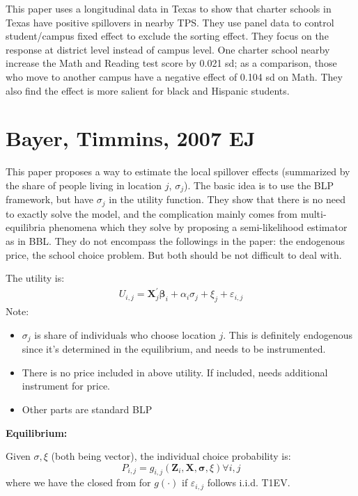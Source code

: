 This paper uses a longitudinal data in Texas to show that charter schools in Texas have positive spillovers in nearby TPS.
They use panel data to control student/campus fixed effect to exclude the sorting effect.
They focus on the response at district level instead of campus level.
One charter school nearby increase the Math and Reading test score by 0.021 sd; as a comparison, those who move to another campus have a negative effect of 0.104 sd on Math. 
They also find the effect is more salient for black and Hispanic students.





\section{Bayer, Timmins, 2007 EJ} %
\label{sec:bayer_timmins_2007_ej}

\textbf{}

This paper proposes a way to estimate the local spillover effects (summarized by the share of people living in location $j$, $\sigma_j$).
The basic idea is to use the BLP framework, but have $\sigma_j$ in the utility function.
They show that there is no need to exactly solve the model, and the complication mainly comes from multi-equilibria phenomena which they solve by proposing a semi-likelihood estimator as in BBL.
They do not encompass the followings in the paper: the endogenous price, the school choice problem. But both should be not difficult to deal with.

The utility is:
\begin{align}
    U_{i, j}=\mathbf{X}_{j}^{\prime} \boldsymbol{\beta}_{i}+\alpha_{i} \sigma_{j}+\xi_{j}+\varepsilon_{i, j}
\end{align}
Note:
\begin{itemize}
    \item $\sigma_j$ is share of individuals who choose location $j$. This is definitely endogenous since it's determined in the equilibrium, and needs to be instrumented.
    \item There is no price included in above utility. If included, needs additional instrument for price.
    \item Other parts are standard BLP
\end{itemize}

\textbf{Equilibrium:}

Given $\sigma,\xi$ (both being vector), the individual choice probability is:
\[
    P_{i, j}=g_{i, j}\left(\mathbf{Z}_{i}, \mathbf{X}, \boldsymbol{\sigma}, \xi\right) \forall i, j
\]
where we have the closed from for $g(\cdot)$ if $\varepsilon_{i,j}$ follows i.i.d. T1EV.

